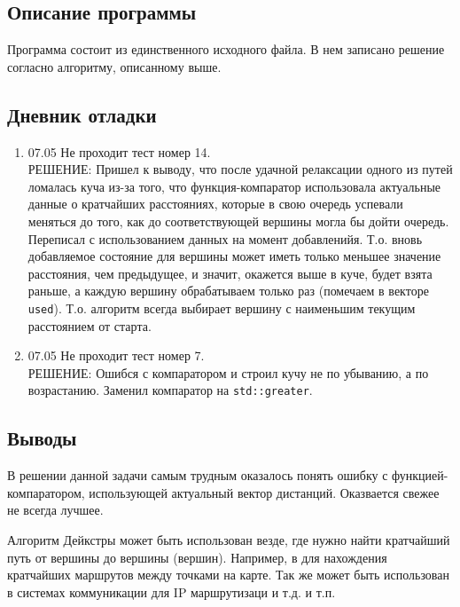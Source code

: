 \documentclass[12pt]{article}
\begin{document}
\subsection*{Описание программы}

Программа состоит из единственного исходного файла. В нем записано решение согласно алгоритму, описанному выше.

\subsection*{Дневник отладки}
\begin{enumerate}
    \item 07.05 Не проходит тест номер 14. \\
    РЕШЕНИЕ: Пришел к выводу, что после удачной релаксации одного из путей ломалась куча из-за того, что функция-компаратор использовала актуальные данные о кратчайших расстояниях, которые в свою очередь успевали меняться до того, как до соответствующей вершины могла бы дойти очередь. Переписал с использованием данных на момент добавленийя. Т.о. вновь добавляемое состояние для вершины может иметь только меньшее значение расстояния, чем предыдущее, и значит, окажется выше в куче, будет взята раньше, а каждую вершину обрабатываем только раз (помечаем в векторе \verb|used|). Т.о. алгоритм всегда выбирает вершину с наименьшим текущим расстоянием от старта.
    \item 07.05 Не проходит тест номер 7. \\
    РЕШЕНИЕ: Ошибся с компаратором и строил кучу не по убыванию, а по возрастанию. Заменил компаратор на \verb|std::greater|.

\end{enumerate}

\subsection*{Выводы}

В решении данной задачи самым трудным оказалось понять ошибку с функцией-компаратором, использующей актуальный вектор дистанций. Оказвается свежее не всегда лучшее.

Алгоритм Дейкстры может быть использован везде, где нужно найти кратчайший путь от вершины до вершины (вершин). Например, в для нахождения кратчайших маршрутов между точками на карте. Так же может быть использован в системах коммуникации для IP маршрутизаци и т.д. и т.п.
\end{document}
